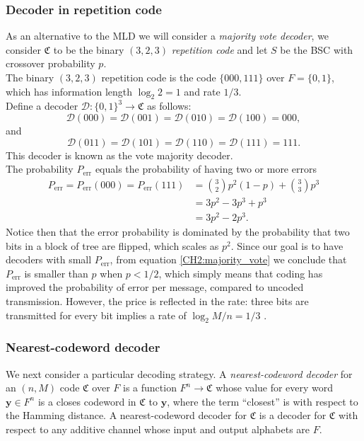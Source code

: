 \subsubsection*{Decoder in repetition code}
As an alternative to the MLD we will consider a \textit{majority vote decoder},  we consider $\mathfrak{C}$ to be the binary $(3,2,3)$ \textit{repetition code} and let $S$ be the BSC with crossover probability $p$.\\
\indent The binary $(3,2,3)$ repetition code is the code $\{000,111\}$ over $F=\{0,1\}$, which has information length $\log_2 2=1$ and rate $1/3$.\\
Define a decoder $\mathcal{D}:\{0,1\}^3\to \mathfrak{C}$ as follows:
\begin{equation}
\mathcal{D}(000)=\mathcal{D}(001)=\mathcal{D}(010)=\mathcal{D}(100) = 000,
\end{equation}
and
\begin{equation}
\mathcal{D}(011)=\mathcal{D}(101)=\mathcal{D}(110)=\mathcal{D}(111) = 111.
\end{equation}
This decoder is known as the vote majority decoder.\\
\indent The probability $P_{\text{err}}$ equals the probability of having two or more errors
\begin{align}
P_{\text{err}} = P_{\text{err}}(000) = P_{\text{err}}(111) &= {3 \choose 2}p^2(1-p) + {3 \choose 3}p^3\nonumber\\
&=3p^2-3p^3+p^3\nonumber\\
&=3p^2-2p^3.
\label{CH2:majority_vote}
\end{align}
Notice then that the error probability is dominated by the probability that two bits in a block of tree are flipped, which scales as $p^2$. Since our goal is to have decoders with small $P_{\text{err}}$, from equation \eqref{CH2:majority_vote} we conclude that $P_{\text{err}}$ is smaller than $p$ when $p<1/2$, which simply means that coding has improved the probability of error per message, compared to uncoded transmission. However, the price is reflected in the rate: three bits are transmitted for every bit implies a rate of $\log_2 M/n = 1/3$ .
\subsubsection*{Nearest-codeword decoder}
\indent We next consider a particular decoding strategy. A \textit{nearest-codeword decoder} for an $(n,M)$ code $\mathfrak{C}$ over $F$ is a function $F^n\to \mathfrak{C}$ whose value for every word $\mathbf{y}\in F^n$ is a closes codeword in $\mathfrak{C}$ to $\mathbf{y}$, where the term ``closest'' is with respect to the Hamming distance. A nearest-codeword decoder for $\mathfrak{C}$ is a decoder for $\mathfrak{C}$ with respect to any additive channel whose input and output alphabets are $F$.
